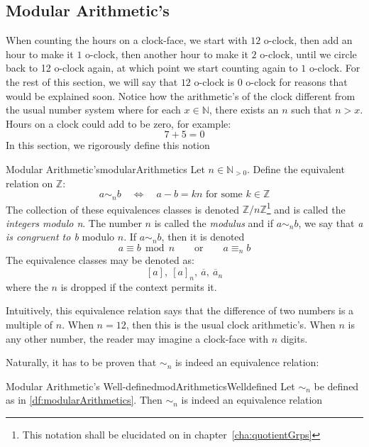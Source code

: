 \documentclass{book}
\newcommand{\N}{{\mathbb{N}}}
\newcommand{\Z}{{\mathbb{Z}}}
\newcommand{\LRw}{\Leftrightarrow}
\newcommand{\oln}[1]{{\overline{#1}}}
\renewcommand{\mod}{\,\operatorname{mod}\,}
\begin{document}
\subsection{Modular Arithmetic’s}\label{sec:modArithmetics}

When counting the hours on a clock-face, we start with $12$ o-clock, then add an hour to make it $1$ o-clock,
then another hour to make it $2$ o-clock, until we circle back to 12 o-clock again, at which point we start
counting again to $1$ o-clock. For the rest of this section, we will say that $12$ o-clock is $0$ o-clock for
reasons that would be explained soon. Notice how the arithmetic's of the clock different from the usual number
system where for each $x \in \N$, there exists an $n$ such that $n > x$. Hours on a clock could add to be
zero, for example:
\[
	7+5=  0
\]
In this section, we rigorously define this notion

\begin{defn}{Modular Arithmetic's}{modularArithmetics}
	Let $n \in \N_{>0}$. Define the equivalent relation on $\Z$:
	\[
		a\sim_n b \quad \LRw \quad a-b = kn\text{ for some $k \in \Z$}
	\]
	The collection of these equivalences classes is denoted $\Z/n\Z$\footnote{This notation shall be
	elucidated on in chapter~\ref{cha:quotientGrps}} and is called the \emph{integers modulo n}. The number $n$
	is called the \emph{modulus} and if $a\sim_n b$, we say that \emph{a is congruent to b} modulo $n$. If
	$a\sim_n b$, then it is denoted
	\[
		a\equiv b \mod n \qquad \text{or} \qquad a \equiv_n b
	\]
	The equivalence classes may be denoted as:
	\[
		[a],\ [a]_n,\ \oln{a},\ \oln{a}_n
	\]
	where the $n$ is dropped if the context permits it.
\end{defn}

Intuitively, this equivalence relation says that the difference of two numbers is a multiple of $n$. When $n
= 12$, then this is the usual clock arithmetic's. When $n$ is any other number, the reader may imagine
a clock-face with $n$ digits.

Naturally, it has to be proven that $\sim_n$ is indeed an equivalence relation:

\begin{prop}{Modular Arithmetic's Well-defined}{modArithmeticsWelldefined}
	Let $\sim_n$ be defined as in \cref{df:modularArithmetics}. Then $\sim_n$ is indeed an
	equivalence relation
\end{prop}
\end{document}
